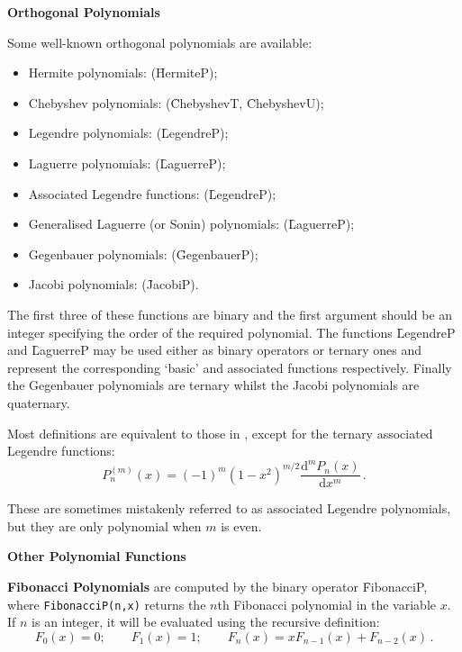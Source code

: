 \textbf{Orthogonal Polynomials}
 

Some well-known orthogonal polynomials are available:
\begin{itemize}
\item Hermite polynomials: (\f{HermiteP});
\item Chebyshev polynomials: (\f{ChebyshevT}, \f{ChebyshevU});
\item Legendre polynomials: (\f{LegendreP});
\item Laguerre polynomials: (\f{LaguerreP});
\item Associated Legendre functions: (\f{LegendreP});
\item Generalised Laguerre (or Sonin) polynomials: (\f{LaguerreP});
\item Gegenbauer polynomials: (\f{GegenbauerP});
\item Jacobi polynomials: (\f{JacobiP}).
\end{itemize}
The first three of these functions are binary and the first
argument should be an integer specifying the order of the
required polynomial. The functions \f{LegendreP} and \f{LaguerreP} may be used
either as binary operators or ternary ones and represent the corresponding
`basic' and associated functions respectively.
Finally the Gegenbauer polynomials are ternary whilst the Jacobi polynomials
are quaternary.

Most definitions are equivalent to those in \cite{AbramowitzStegun:72},
except for the ternary associated Legendre functions:
$$P_n^{(m)}(x) = (-1)^m(1-x^2)^{m/2}\frac{\mathrm{d}^m P_n(x)}{\mathrm{d}x^m}\,.$$

These are sometimes mistakenly referred to as associated Legendre polynomials,
but they are only polynomial when $m$ is even.

\textbf{Other Polynomial Functions}
\hypertarget{operator:FIBONACCIP}{}

\textbf{Fibonacci Polynomials} are computed by the binary operator
\f{FibonacciP}, where
\texttt{FibonacciP(n,x)} returns the $n$th Fibonacci polynomial
in the variable $x$. If $n$ is an integer, it will be
evaluated using the recursive definition:
$$F_0(x) = 0;\qquad F_1(x) = 1; \qquad F_n(x) = x F_{n-1}(x) + F_{n-2}(x)\,.$$

